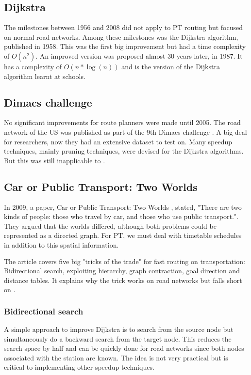 \subsection{Dijkstra}
The milestones between 1956 and 2008 did not apply to PT routing but focused on normal road networks. Among these milestones was the Dijkstra algorithm, published in 1958. This was the first big improvement but had a time complexity of $O(n^2)$. An improved version was proposed almost 30 years later, in 1987. It has a complexity of $O(n*\log(n))$ and is the version of the Dijkstra algorithm learnt at schools.%
\subsection{Dimacs challenge}
No significant improvements for route planners were made until 2005. The road network of the US was published as part of the 9th Dimacs challenge \cite{noauthor_9th_2017}. A big deal for researchers, now they had an extensive dataset to test on. Many speedup techniques, mainly pruning techniques, were devised for the Dijkstra algorithms. But this was still inapplicable to .

\subsection{Car or Public Transport: Two Worlds}
In 2009, a paper, Car or Public Transport: Two Worlds \cite{bast_car_2009}, stated, "There are two kinds of people: those who travel by car, and those who use public transport.". They argued that the worlds differed, although both problems could be represented as a directed graph. For PT, we must deal with timetable schedules in addition to this spatial information.

The article covers five big "tricks of the trade" for fast routing on transportation: Bidirectional search, exploiting hierarchy, graph contraction, goal direction and distance tables. It explains why the trick works on road networks but falls short on .

\subsubsection{Bidirectional search}
A simple approach to improve Dijkstra is to search from the source node but simultaneously do a backward search from the target node. This reduces the search space by half and can be quickly done for road networks since both nodes associated with the station are known. The idea is not very practical but is critical to implementing other speedup techniques.

